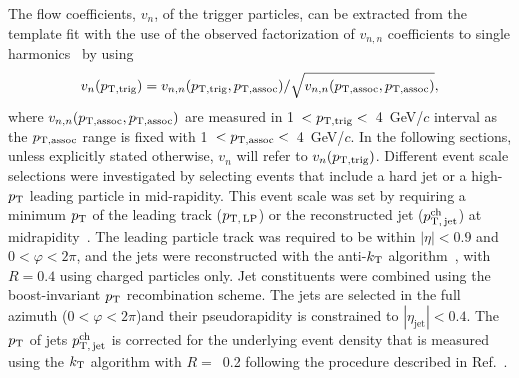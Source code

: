 

The flow coefficients, $v_{n}$, of the trigger particles, can be extracted from the template fit with the use of the observed factorization of $v_{n,n}$ coefficients to single harmonics~\cite{ATLAS:2015hzw,ATLAS:2016yzd} by using
\begin{eqnarray}
v_{n}(p_{\rm{T,trig}}) = v_{n,n}(p_{\rm{T,trig}}, p_{\rm{T,assoc}}) / \sqrt{ v_{n,n}(p_{\rm{T,assoc}},p_{\rm{T,assoc}})},
\end{eqnarray}
where $v_{n,n}(p_{\rm{T,assoc}}, p_{\rm{T,assoc}})$ are measured in 1~$<p_{\rm{T,trig}}<$~4~GeV/$c$ interval as the $p_{\rm{T,assoc}}$ range is fixed with 1~$<p_{\rm{T,assoc}}<$~4~GeV/$c$. In the following sections, unless explicitly stated otherwise, $v_n$ will refer to $v_n(p_{\rm{T,trig}})$.
Different event scale selections were investigated by selecting events that include a hard jet or a high-$p_\mathrm{T}$ leading particle in mid-rapidity.
This event scale was set by requiring a minimum $p_\mathrm{T}$ of the leading track ($p_\mathrm{T,\,LP}$) or the reconstructed jet ($p_\mathrm{T,\,jet}^\mathrm{ch}$) at midrapidity~\cite{ALICE:2021nir}. The leading particle track was required to be within $|\eta|<0.9$ and $0<\varphi<2\pi$, and the jets were reconstructed with the anti-$k_{\rm{T}}$ algorithm~\cite{Cacciari:2008gp,Cacciari:2011ma}, with $R=0.4$ using charged particles only. Jet constituents were combined using the boost-invariant $p_\mathrm{T}$ recombination scheme. The jets are selected in the full azimuth ($0<\varphi<2\pi$)and their pseudorapidity is constrained to $|\eta_\mathrm{jet}|<0.4$. The $p_\mathrm{T}$ of jets $p_\mathrm{T,\,jet}^\mathrm{ch}$ is corrected for the underlying event density that is measured using the $k_{\rm{T}}$ algorithm with $R=$~0.2 following the procedure described in Ref.~\cite{Acharya:2018eat}.

